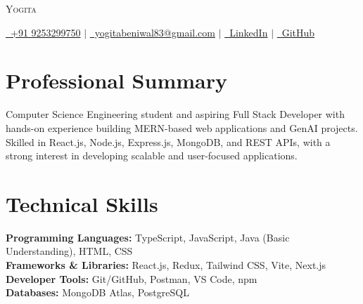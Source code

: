 \documentclass[letterpaper,11pt]{article}
\begin{document}

\begin{center}
{\Huge \scshape Yogita} \\ \vspace{6pt}

\small
\href{tel:+919253299750}{\faPhone\ +91 9253299750}
\quad $|$ \quad
\href{mailto:yogitabeniwal83@gmail.com}{\faEnvelope\ yogitabeniwal83@gmail.com}
\quad $|$ \quad
\href{https://www.linkedin.com/in/yogita-beniwal-44056a383}{\faLinkedin\ LinkedIn}
\quad $|$ \quad
\href{https://github.com/yogitabeniwal83}{\faGithub\ GitHub}

\vspace{-8pt}
\end{center}



\section{Professional Summary}

\begin{justify}
\small{
Computer Science Engineering student and aspiring Full Stack Developer
with hands-on experience building MERN-based web applications and GenAI
projects. Skilled in React.js, Node.js, Express.js, MongoDB, and REST APIs,
with a strong interest in developing scalable and user-focused applications.
}
\end{justify}

\vspace{-10pt}



\section{Technical Skills}

\begin{itemize}[leftmargin=0.15in,label={}]

\small{\item{

\textbf{Programming Languages:}
TypeScript, JavaScript, Java (Basic Understanding), HTML, CSS \\

\textbf{Frameworks \& Libraries:}
React.js, Redux, Tailwind CSS, Vite, Next.js \\

\textbf{Developer Tools:}
Git/GitHub, Postman, VS Code, npm \\

\textbf{Databases:}
MongoDB Atlas, PostgreSQL

}}

\end{itemize}
\end{document}
